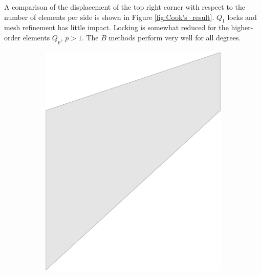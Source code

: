 A comparison of the displacement of the top right corner with respect to the number of elements per side is shown in Figure \ref{fig:Cook's_result}. $Q_1$ locks and mesh refinement has little impact. Locking is somewhat reduced for the higher-order elements $Q_p$, $p > 1$. The $\bar{B}$ methods perform very well for all degrees.
\begin{figure}[htb!]
    \centering
    \begin{subfigure}[b]{0.18\linewidth}        %
        \centering
        \includegraphics[width=\linewidth]{mesh_cook_0}
    \end{subfigure}
    \begin{subfigure}[b]{0.18\linewidth}        %
        \centering

\end{subfigure}
\end{figure}
